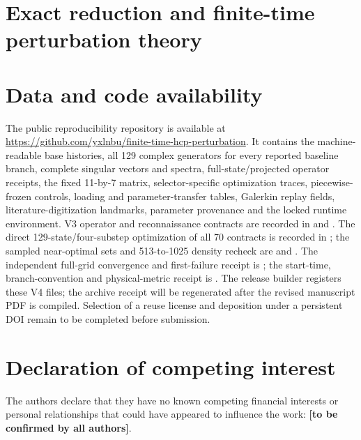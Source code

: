 \documentclass[preprint,12pt]{elsarticle}
\begin{document}
\section{Exact reduction and finite-time perturbation theory}
\label{sec:dynamic_theory}







\section*{Data and code availability}
The public reproducibility repository is available at \url{https://github.com/yxlnbu/finite-time-hcp-perturbation}. It contains the machine-readable base histories, all 129 complex generators for every reported baseline branch, complete singular vectors and spectra, full-state/projected operator receipts, the fixed 11-by-7 matrix, selector-specific optimization traces, piecewise-frozen controls, loading and parameter-transfer tables, Galerkin replay fields, literature-digitization landmarks, parameter provenance and the locked runtime environment. V3 operator and reconnaissance contracts are recorded in  and . The direct 129-state/four-substep optimization of all 70 contracts is recorded in ; the sampled near-optimal sets and 513-to-1025 density recheck are  and . The independent full-grid convergence and first-failure receipt is ; the start-time, branch-convention and physical-metric receipt is . The release builder registers these V4 files; the archive receipt will be regenerated after the revised manuscript PDF is compiled. Selection of a reuse license and deposition under a persistent DOI remain to be completed before submission.

\section*{Declaration of competing interest}
The authors declare that they have no known competing financial interests or personal relationships that could have appeared to influence the work: \textbf{[to be confirmed by all authors]}.
\end{document}
